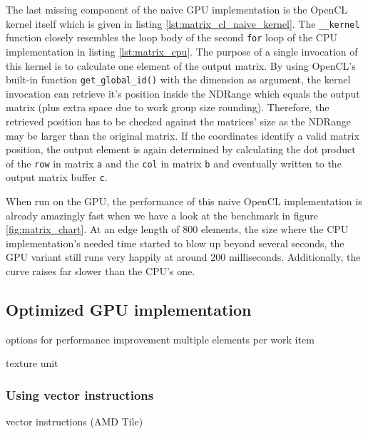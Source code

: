 

The last missing component of the naive GPU implementation is the OpenCL kernel itself which is given in listing \ref{lst:matrix_cl_naive_kernel}. The \lstinline!__kernel! function closely resembles the loop body of the second \lstinline!for! loop of the CPU implementation in listing \ref{lst:matrix_cpu}. The purpose of a single invocation of this kernel is to calculate one element of the output matrix. By using OpenCL's built-in function \lstinline!get_global_id()! with the dimension as argument, the kernel invocation can retrieve it's position inside the NDRange which equals the output matrix (plus extra space due to work group size rounding). Therefore, the retrieved position has to be checked against the matrices' size as the NDRange may be larger than the original matrix. If the coordinates identify a valid matrix position, the output element is again determined by calculating the dot product of the \lstinline!row! in matrix \lstinline!a! and the \lstinline!col! in matrix \lstinline!b! and eventually written to the output matrix buffer \lstinline!c!.



When run on the GPU, the performance of this naive OpenCL implementation is already amazingly fast when we have a look at the benchmark in figure \ref{fig:matrix_chart}. At an edge length of 800 elements, the size where the CPU implementation's needed time started to blow up beyond several seconds, the GPU variant still runs very happily at around 200 milliseconds. Additionally, the curve raises far slower than the CPU's one.


\subsection{Optimized GPU implementation}
options for performance improvement
multiple elements per work item

texture unit

\subsubsection{Using vector instructions}
vector instructions (AMD Tile)


